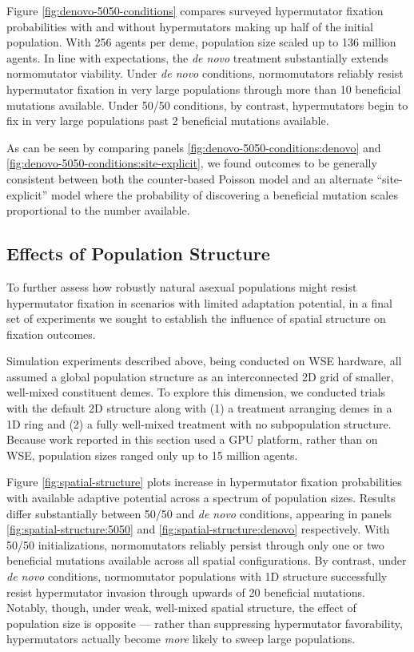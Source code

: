 Figure \ref{fig:denovo-5050-conditions} compares surveyed hypermutator fixation probabilities with and without hypermutators making up half of the initial population.
With 256 agents per deme, population size scaled up to 136 million agents.
In line with expectations, the \textit{de novo} treatment substantially extends normomutator viability.
Under \textit{de novo} conditions, normomutators reliably resist hypermutator fixation in very large populations through more than 10 beneficial mutations available.
Under 50/50 conditions, by contrast, hypermutators begin to fix in very large populations past 2 beneficial mutations available.

As can be seen by comparing panels \ref{fig:denovo-5050-conditions:denovo} and \ref{fig:denovo-5050-conditions:site-explicit}, we found outcomes to be generally consistent between both the counter-based Poisson model and an alternate ``site-explicit'' model where the probability of discovering a beneficial mutation scales proportional to the number available.

\subsection{Effects of Population Structure}
\label{sec:population-structure}

To further assess how robustly natural asexual populations might resist hypermutator fixation in scenarios with limited adaptation potential, in a final set of experiments we sought to establish the influence of spatial structure on fixation outcomes.

Simulation experiments described above, being conducted on WSE hardware, all assumed a global population structure as an interconnected 2D grid of smaller, well-mixed constituent demes.
To explore this dimension, we conducted trials with the default 2D structure along with (1) a treatment arranging demes in a 1D ring and (2) a fully well-mixed treatment with no subpopulation structure.
Because work reported in this section used a GPU platform, rather than on WSE, population sizes ranged only up to 15 million agents.



Figure \ref{fig:spatial-structure} plots increase in hypermutator fixation probabilities with available adaptive potential across a spectrum of population sizes.
Results differ substantially between 50/50 and \textit{de novo} conditions, appearing in panels \ref{fig:spatial-structure:5050} and \ref{fig:spatial-structure:denovo} respectively.
With 50/50 initializations, normomutators reliably persist through only one or two beneficial mutations available across all spatial configurations.
By contrast, under \textit{de novo} conditions, normomutator populations with 1D structure successfully resist hypermutator invasion through upwards of 20 beneficial mutations.
Notably, though, under weak, well-mixed spatial structure, the effect of population size is opposite --- rather than suppressing hypermutator favorability, hypermutators actually become \textit{more} likely to sweep large populations.

